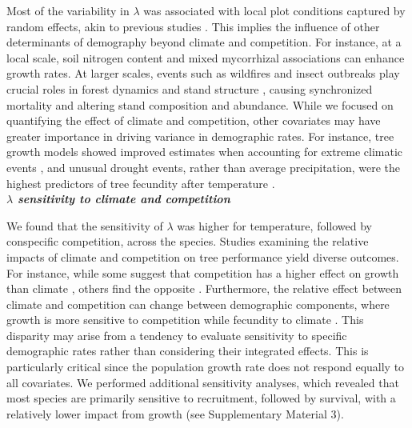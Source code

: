 Most of the variability in \(\lambda\) was associated with local plot
conditions captured by random effects, akin to previous studies
\citep{Vanderwel2016a, LeSquin2021}. This implies the influence of other
determinants of demography beyond climate and competition. For instance,
at a local scale, soil nitrogen content \citep{Ibanez2018} and mixed
mycorrhizal associations \citep{Luo2023} can enhance growth rates. At
larger scales, events such as wildfires and insect outbreaks play
crucial roles in forest dynamics and stand structure
\citep{Franklin2002}, causing synchronized mortality and altering stand
composition and abundance. While we focused on quantifying the effect of
climate and competition, other covariates may have greater importance in
driving variance in demographic rates. For instance, tree growth models
showed improved estimates when accounting for extreme climatic events
\citep{Sangines2017}, and unusual drought events, rather than average
precipitation, were the highest predictors of tree fecundity after
temperature \citep{Clark2011}.\\

\textbf{\emph{\(\lambda\) sensitivity to climate and competition}}

We found that the sensitivity of \(\lambda\) was higher for temperature,
followed by conspecific competition, across the species. Studies
examining the relative impacts of climate and competition on tree
performance yield diverse outcomes. For instance, while some suggest
that competition has a higher effect on growth than climate
\citep{GomezAparicio2011, LeSquin2021}, others find the opposite
\citep{CopenhaverParry2016}. Furthermore, the relative effect between
climate and competition can change between demographic components, where
growth is more sensitive to competition while fecundity to climate
\citep{Clark2011}. This disparity may arise from a tendency to evaluate
sensitivity to specific demographic rates rather than considering their
integrated effects. This is particularly critical since the population
growth rate does not respond equally to all covariates. We performed
additional sensitivity analyses, which revealed that most species are
primarily sensitive to recruitment, followed by survival, with a
relatively lower impact from growth (see Supplementary Material 3).\\


